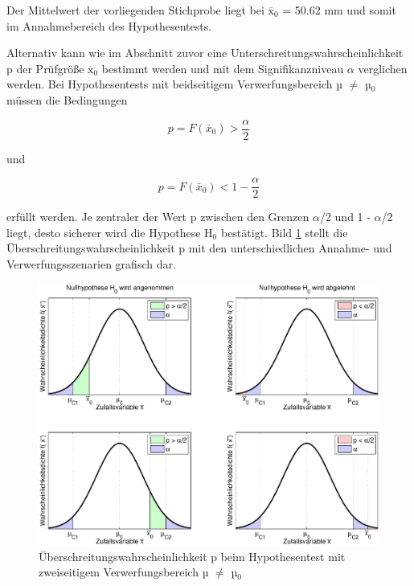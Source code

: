 \noindent Der Mittelwert der vorliegenden Stichprobe liegt bei ${\overline{\mathrm{x}}}_0$ = 50.62 mm und somit im Annahmebereich des Hypothesentests.

\clearpage

\noindent Alternativ kann wie im Abschnitt zuvor eine Unterschreitungswahrscheinlichkeit p der Pr\"{u}fgr\"{o}{\ss}e ${\overline{\mathrm{x}}}_0$ bestimmt werden und mit dem Signifikanzniveau $\alpha$ verglichen werden. Bei Hypothesentests mit beidseitigem Verwerfungsbereich µ $\neq$ µ$_{0}$ m\"{u}ssen die Bedingungen

\begin{equation}\label{eq:sixfourtytwo}
p=F\left(\bar{x}_{0} \right)>\dfrac{\alpha }{2}
\end{equation}

\noindent und

\begin{equation}\label{eq:sixfourtythree}
p=F(\bar{x}_{0})<1-\dfrac{\alpha}{2}
\end{equation}

\noindent erf\"{u}llt werden. Je zentraler der Wert p zwischen den Grenzen $\alpha$/2 und 1 - $\alpha$/2 liegt, desto sicherer wird die Hypothese H$_{0}$ best\"{a}tigt. Bild \ref{fig:HypothesentestBeidseitigerVerwerfungsbereichPvalue} stellt die \"{U}berschreitungswahrscheinlichkeit p mit den unterschiedlichen Annahme- und Verwerfungsszenarien grafisch dar. 

\noindent 
\begin{figure}[H]
  \centerline{\includegraphics[width=1\textwidth]{Kapitel6/Bilder/image8}}
  \caption{\"{U}berschreitungswahrscheinlichkeit p beim Hypothesentest mit zweiseitigem Verwerfungsbereich µ $\neq$ µ${}_{0}$}
  \label{fig:HypothesentestBeidseitigerVerwerfungsbereichPvalue}
\end{figure}

